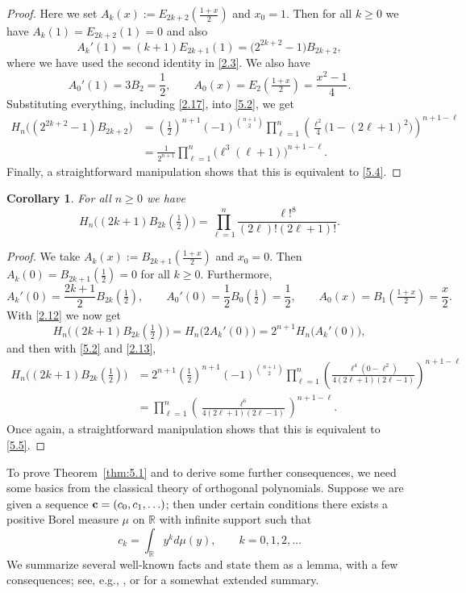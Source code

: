\documentclass{amsart}
\theoremstyle{plain}
\newtheorem{corollary}[theorem]{Corollary}
\numberwithin{equation}{section}
\begin{document}
\begin{proof}
Here we set $A_k(x):=E_{2k+2}(\frac{1+x}{2})$ and $x_0=1$. Then for all 
$k\geq 0$ we have $A_k(1)=E_{2k+2}(1)=0$ and also
\[
A_k'(1) = (k+1)E_{2k+1}(1) = \big(2^{2k+2}-1\big)B_{2k+2},
\]
where we have used the second identity in \eqref{2.3}. We also have
\[
A_0'(1) = 3B_2=\frac{1}{2},\qquad A_0(x)=E_2(\tfrac{1+x}{2})=\frac{x^2-1}{4}.
\]
Substituting everything, including \eqref{2.17}, into \eqref{5.2}, we get
\begin{align*}
H_n\big((2^{2k+2}-1)B_{2k+2}\big)
&= \left(\tfrac{1}{2}\right)^{n+1}(-1)^{\binom{n+1}{2}}
\prod_{\ell=1}^n\left(\frac{\ell^2}{4}\big(1-(2\ell+1)^2\big)\right)^{n+1-\ell} \\
&= \frac{1}{2^{n+1}}\prod_{\ell=1}^n\big(\ell^3(\ell+1)\big)^{n+1-\ell}.
\end{align*}
Finally, a straightforward manipulation shows that this is equivalent to 
\eqref{5.4}.
\end{proof}

\begin{corollary}\label{cor:5.4}
For all $n\geq 0$ we have
\begin{equation}\label{5.5}
H_n\big((2k+1)B_{2k}(\tfrac{1}{2})\big)
= \prod_{\ell=1}^n\frac{\ell!^8}{(2\ell)!(2\ell+1)!}.
\end{equation}
\end{corollary}

\begin{proof}
We take $A_k(x):=B_{2k+1}(\frac{1+x}{2})$ and $x_0=0$. Then 
$A_k(0)=B_{2k+1}(\frac{1}{2})=0$ for all $k\geq 0$. Furthermore,
\[
A_k'(0)=\frac{2k+1}{2}B_{2k}(\tfrac{1}{2}),\qquad
A_0'(0)=\frac{1}{2}B_0(\tfrac{1}{2})=\frac{1}{2},\qquad
A_0(x)=B_1(\tfrac{1+x}{2})=\frac{x}{2}.
\]
With \eqref{2.12} we now get
\[
H_n\big((2k+1)B_{2k}(\tfrac{1}{2})\big) = H_n\big(2A_k'(0)\big)
= 2^{n+1}H_n\big(A_k'(0)\big),
\]
and then with \eqref{5.2} and \eqref{2.13},
\begin{align*}
H_n\big((2k+1)B_{2k}(\tfrac{1}{2})\big) &= 2^{n+1}\left(\tfrac{1}{2}\right)^{n+1}
(-1)^{\binom{n+1}{2}}\prod_{\ell=1}^{n}
\left(\frac{\ell^{4}(0-\ell^{2})}{4(2\ell+1)(2\ell-1)}\right)^{n+1-\ell}\\
&= \prod_{\ell=1}^{n}\left(\frac{\ell^6}{4(2\ell+1)(2\ell-1)}\right)^{n+1-\ell}.
\end{align*}
Once again, a straightforward manipulation shows that this is equivalent to
\eqref{5.5}.
\end{proof}

To prove Theorem~\ref{thm:5.1} and to derive some further consequences, we need
some basics from the classical theory of orthogonal polynomials. Suppose we are
given a sequence ${\bf c}=(c_0, c_1, \ldots)$; then under certain conditions
there exists a positive Borel measure $\mu$ on ${\mathbb R}$ with infinite 
support such that 
\begin{equation}\label{5.6} 
c_k = \int_{\mathbb R}y^kd\mu(y),\qquad k = 0, 1, 2, \ldots
\end{equation}
We summarize several well-known facts and state them as a lemma, with a few
consequences; see, e.g., \cite[Ch.~2]{Is}, or \cite[Sect.~3]{DJ} for a somewhat
extended summary.
\end{document}
